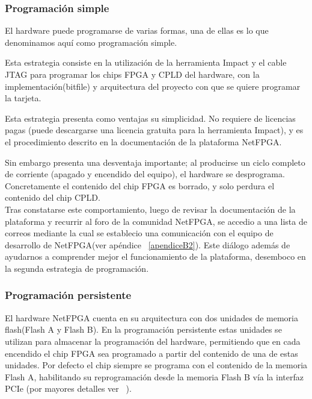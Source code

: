 
\subsubsection{Programaci\'on simple}
El hardware puede programarse de varias formas, una de ellas es lo que denominamos aqu\'i como programaci\'on simple. 

Esta estrategia consiste en la utilizaci\'on de la herramienta Impact y el cable JTAG para programar los chips FPGA y CPLD del hardware, con la implementaci\'on(bitfile) y arquitectura del proyecto con que se quiere programar la tarjeta.

Esta estrategia presenta como ventajas su simplicidad. No requiere de licencias pagas (puede descargarse una licencia gratuita para la herramienta Impact), y es el procedimiento descrito en la documentaci\'on de la plataforma NetFPGA.

Sin embargo presenta una desventaja importante; al producirse un ciclo completo de corriente (apagado y encendido del equipo), el hardware se desprograma. Concretamente el contenido del chip FPGA es borrado, y solo perdura el contenido del chip CPLD.\\

Tras constatarse este comportamiento, luego de revisar la documentaci\'on de la plataforma y recurrir al foro de la comunidad NetFPGA, se accedio a una lista de correos mediante la cual se establecio una comunicaci\'on con el equipo de desarrollo de NetFPGA(ver ap\'endice ~\ref{apendiceB2}). Este di\'alogo adem\'as de ayudarnos a comprender mejor el funcionamiento de la plataforma, desemboco en la segunda estrategia de programaci\'on.

\subsubsection{Programaci\'on persistente}
El hardware NetFPGA cuenta en su arquitectura con dos unidades de memoria flash(Flash A y Flash B). En la programaci\'on persistente estas unidades se utilizan para almacenar la programaci\'on del hardware, permitiendo que en cada encendido el chip FPGA sea programado a partir del contenido de una de estas unidades. Por defecto el chip siempre se programa con el contenido de la memoria Flash A, habilitando su reprogramaci\'on desde la memoria Flash B v\'ia la interfaz PCIe (por mayores detalles ver ~\citep{PCIEProgProject}).\\

